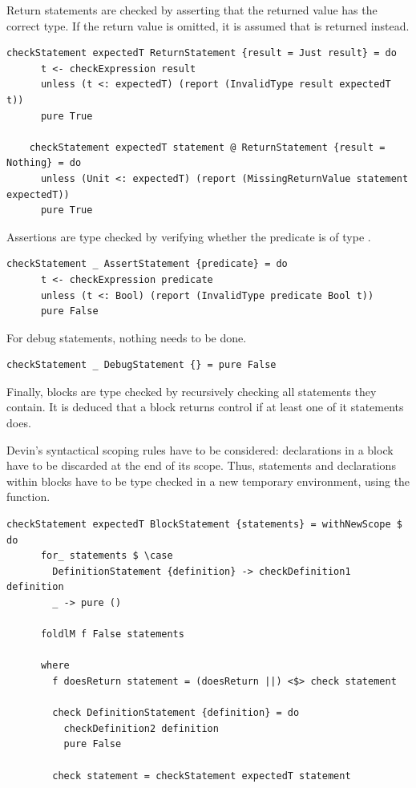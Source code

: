 \documentclass[UdineBachThesis,american,11pt]{PhdThesis}
\begin{document}
  Return statements are checked by asserting that the returned value has the
  correct type. If the return value is omitted, it is assumed that
  \lstinline@unit@ is returned instead.

  \begin{lstlisting}[gobble=4,basicstyle=\ttfamily\small]
    checkStatement expectedT ReturnStatement {result = Just result} = do
      t <- checkExpression result
      unless (t <: expectedT) (report (InvalidType result expectedT t))
      pure True

    checkStatement expectedT statement @ ReturnStatement {result = Nothing} = do
      unless (Unit <: expectedT) (report (MissingReturnValue statement expectedT))
      pure True
  \end{lstlisting}

  Assertions are type checked by verifying whether the predicate is of type
  \lstinline@Bool@.

  \begin{lstlisting}[gobble=4,basicstyle=\ttfamily\small]
    checkStatement _ AssertStatement {predicate} = do
      t <- checkExpression predicate
      unless (t <: Bool) (report (InvalidType predicate Bool t))
      pure False
  \end{lstlisting}

  For debug statements, nothing needs to be done.

  \begin{lstlisting}[gobble=4,basicstyle=\ttfamily\small]
    checkStatement _ DebugStatement {} = pure False
  \end{lstlisting}

  Finally, blocks are type checked by recursively checking all statements they
  contain. It is deduced that a block returns control if at least one of it
  statements does.

  Devin's syntactical scoping rules have to be considered: declarations in a
  block have to be discarded at the end of its scope. Thus, statements and
  declarations within blocks have to be type checked in a new temporary
  environment, using the \lstinline@withNewScope@ function.

  \begin{lstlisting}[gobble=4,basicstyle=\ttfamily\small]
    checkStatement expectedT BlockStatement {statements} = withNewScope $ do
      for_ statements $ \case
        DefinitionStatement {definition} -> checkDefinition1 definition
        _ -> pure ()

      foldlM f False statements

      where
        f doesReturn statement = (doesReturn ||) <$> check statement

        check DefinitionStatement {definition} = do
          checkDefinition2 definition
          pure False

        check statement = checkStatement expectedT statement
  \end{lstlisting}
\end{document}
